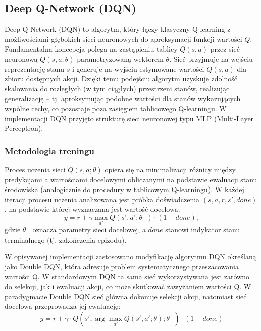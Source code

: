\documentclass[a4paper,12pt]{article}
\begin{document}
\subsection{Deep Q-Network (DQN)}

Deep Q-Network (DQN) to algorytm, który łączy klasyczny Q-learning z możliwościami głębokich sieci neuronowych do aproksymacji funkcji wartości \(Q\). Fundamentalna koncepcja polega na zastąpieniu tablicy \(Q(s,a)\) przez sieć neuronową \(Q(s,a;\theta)\) parametryzowaną wektorem \(\theta\). Sieć przyjmuje na wejściu reprezentację stanu \(s\) i generuje na wyjściu estymowane wartości \(Q(s,a)\) dla zbioru dostępnych akcji. Dzięki temu podejściu algorytm uzyskuje zdolność skalowania do rozległych (w tym ciągłych) przestrzeni stanów, realizując generalizację – tj. aproksymując podobne wartości dla stanów wykazujących wspólne cechy, co pozostaje poza zasięgiem tablicowego Q-learningu.
W implementacji DQN przyjęto strukturę sieci neuronowej typu MLP (Multi-Layer Perceptron).

\subsubsection{Metodologia treningu}

Proces uczenia sieci \(Q(s,a;\theta)\) opiera się na minimalizacji różnicy między predykcjami a wartościami docelowymi obliczanymi na podstawie ewaluacji stanu środowiska (analogicznie do procedury w tablicowym Q-learningu). W każdej iteracji procesu uczenia analizowana jest próbka doświadczenia \((s,a,r,s',done)\), na podstawie której wyznaczana jest wartość docelowa:
\begin{equation}
y = r + \gamma \max_{a'} Q(s',a';\theta^-) \cdot (1 - done),
\end{equation}
gdzie \(\theta^-\) oznacza parametry sieci docelowej, a \(done\) stanowi indykator stanu terminalnego (tj. zakończenia epizodu). 

W opisywanej implementacji zastosowano modyfikację algorytmu DQN określaną jako Double DQN, która adresuje problem systematycznego przeszacowania wartości Q. W standardowym DQN ta sama sieć wykorzystywana jest zarówno do selekcji, jak i ewaluacji akcji, co może skutkować zawyżaniem wartości Q. W paradygmacie Double DQN sieć główna dokonuje selekcji akcji, natomiast sieć docelowa przeprowadza jej ewaluację:
\begin{equation}
y = r + \gamma \cdot Q(s', \arg\max_{a'} Q(s',a';\theta); \theta^-) \cdot (1 - done)
\end{equation}
\end{document}

